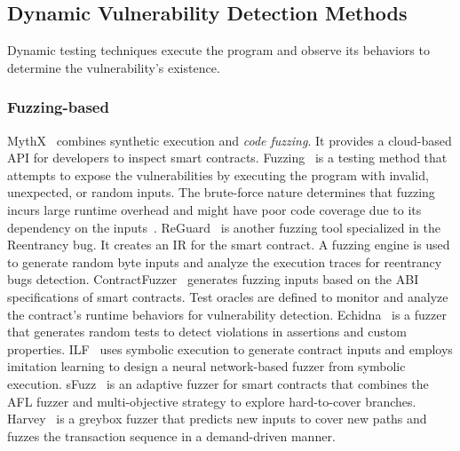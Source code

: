 \subsection{Dynamic Vulnerability Detection Methods}
\label{sec:related:dynamic}
Dynamic testing techniques execute the program and observe its behaviors to determine the vulnerability's existence. 

\subsubsection{Fuzzing-based} {MythX}~\cite{rw_mythx_page} 
combines synthetic execution and \textit{code fuzzing}. It provides a cloud-based API for developers to inspect smart contracts.
Fuzzing~\cite{godefroid2012sage} is a testing method that attempts to expose the vulnerabilities by executing the program with invalid, unexpected, or random inputs. The brute-force nature determines that fuzzing incurs large runtime overhead and might have poor code coverage due to its dependency on the inputs~\cite{rw_tech_02}.
{ReGuard}~\cite{ethereum-background-05} is another fuzzing tool specialized in the Reentrancy bug. It creates an IR for the smart contract. A fuzzing engine is used to generate random byte inputs and analyze the execution traces for reentrancy bugs detection.  
{ContractFuzzer}~\cite{contractfuzzer} generates fuzzing inputs based on the ABI specifications of smart contracts. Test oracles are defined to monitor and analyze the contract's runtime behaviors for vulnerability detection. 
{Echidna}~\cite{echidna} is a fuzzer that generates random tests to detect violations in assertions and custom properties. 
{ILF}~\cite{ilf} uses symbolic execution to generate contract inputs and employs imitation learning to design a neural network-based fuzzer from symbolic execution.
{sFuzz}~\cite{nguyen2020sfuzz} is an adaptive fuzzer for smart contracts that combines the AFL fuzzer and multi-objective strategy to explore hard-to-cover branches. 
{Harvey}~\cite{wustholz2020harvey} is a greybox fuzzer that predicts new inputs to cover new paths and fuzzes the transaction sequence in a demand-driven manner. 

